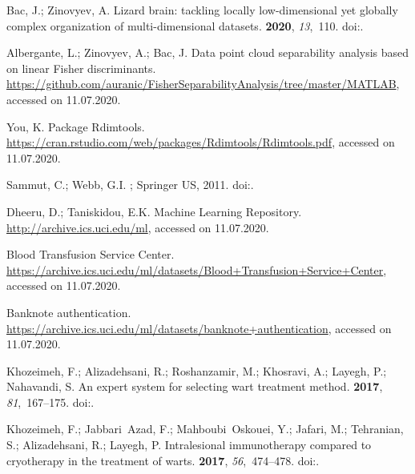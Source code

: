 \documentclass[entropy,article,submit,moreauthors,pdftex]{Definitions/mdpi}
\begin{document}
\begin{thebibliography}{-------}
Bac, J.; Zinovyev, A.
\newblock Lizard brain: tackling locally low-dimensional yet globally complex
  organization of multi-dimensional datasets.
 {\bf 2020}, {\em 13},~110.
\newblock
  doi:{\href{https://doi.org/10.3389/fnbot.2019.00110}{}}.

Albergante, L.; Zinovyev, A.; Bac, J.
\newblock Data point cloud separability analysis based on linear Fisher
  discriminants.
\newblock
  \url{https://github.com/auranic/FisherSeparabilityAnalysis/tree/master/MATLAB},
  accessed on 11.07.2020.

You, K.
\newblock Package Rdimtools.
\newblock \url{https://cran.rstudio.com/web/packages/Rdimtools/Rdimtools.pdf},
  accessed on 11.07.2020.

Sammut, C.; Webb, G.I.
; Springer {US},  2011.
\newblock
  doi:{\href{https://doi.org/10.1007/978-0-387-30164-8}{}}.

Dheeru, D.; Taniskidou, E.K.
 Machine Learning Repository.
\newblock \url{http://archive.ics.uci.edu/ml}, accessed on 11.07.2020.

Blood Transfusion Service Center.
\newblock
  \url{https://archive.ics.uci.edu/ml/datasets/Blood+Transfusion+Service+Center},
  accessed on 11.07.2020.

Banknote authentication.
\newblock
  \url{https://archive.ics.uci.edu/ml/datasets/banknote+authentication},
  accessed on 11.07.2020.

Khozeimeh, F.; Alizadehsani, R.; Roshanzamir, M.; Khosravi, A.; Layegh, P.;
  Nahavandi, S.
\newblock An expert system for selecting wart treatment method.
 {\bf 2017}, {\em 81},~167--175.
\newblock
  doi:{\href{https://doi.org/10.1016/j.compbiomed.2017.01.001}{}}.

Khozeimeh, F.; Jabbari~Azad, F.; Mahboubi~Oskouei, Y.; Jafari, M.; Tehranian,
  S.; Alizadehsani, R.; Layegh, P.
\newblock Intralesional immunotherapy compared to cryotherapy in the treatment
  of warts.
 {\bf 2017}, {\em 56},~474--478.
\newblock
  doi:{\href{https://doi.org/10.1111/ijd.13535}{}}.


\end{thebibliography}
\end{document}
